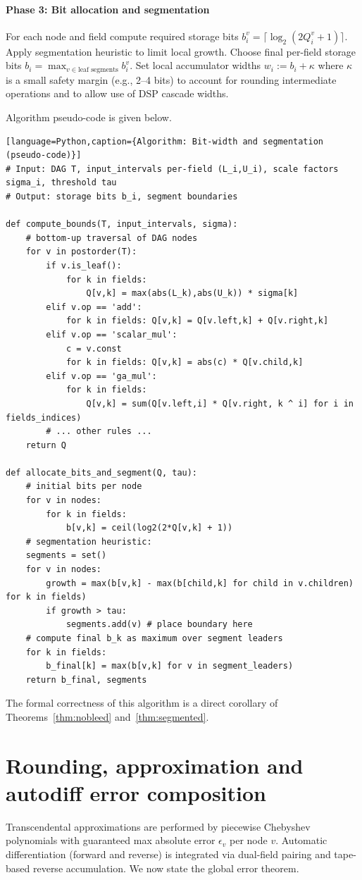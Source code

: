 \documentclass[11pt]{article}
\theoremstyle{definition}
\theoremstyle{plain}
\begin{document}
\paragraph{Phase 3: Bit allocation and segmentation} For each node and field compute required storage bits \(b_i^v = \lceil \log_2(2Q_i^v + 1)\rceil\). Apply segmentation heuristic to limit local growth. Choose final per-field storage bits \(b_i = \max_{v\in \text{leaf segments}} b_i^v\). Set local accumulator widths \(w_i := b_i + \kappa\) where \(\kappa\) is a small safety margin (e.g., 2--4 bits) to account for rounding intermediate operations and to allow use of DSP cascade widths.

Algorithm pseudo-code is given below.

\begin{verbatim}[language=Python,caption={Algorithm: Bit-width and segmentation (pseudo-code)}]
# Input: DAG T, input_intervals per-field (L_i,U_i), scale factors sigma_i, threshold tau
# Output: storage bits b_i, segment boundaries

def compute_bounds(T, input_intervals, sigma):
    # bottom-up traversal of DAG nodes
    for v in postorder(T):
        if v.is_leaf():
            for k in fields:
                Q[v,k] = max(abs(L_k),abs(U_k)) * sigma[k]
        elif v.op == 'add':
            for k in fields: Q[v,k] = Q[v.left,k] + Q[v.right,k]
        elif v.op == 'scalar_mul':
            c = v.const
            for k in fields: Q[v,k] = abs(c) * Q[v.child,k]
        elif v.op == 'ga_mul':
            for k in fields:
                Q[v,k] = sum(Q[v.left,i] * Q[v.right, k ^ i] for i in fields_indices)
        # ... other rules ...
    return Q

def allocate_bits_and_segment(Q, tau):
    # initial bits per node
    for v in nodes:
        for k in fields:
            b[v,k] = ceil(log2(2*Q[v,k] + 1))
    # segmentation heuristic:
    segments = set()
    for v in nodes:
        growth = max(b[v,k] - max(b[child,k] for child in v.children) for k in fields)
        if growth > tau:
            segments.add(v) # place boundary here
    # compute final b_k as maximum over segment leaders
    for k in fields:
        b_final[k] = max(b[v,k] for v in segment_leaders)
    return b_final, segments
\end{verbatim}

The formal correctness of this algorithm is a direct corollary of Theorems~\ref{thm:nobleed} and~\ref{thm:segmented}.

\section{Rounding, approximation and autodiff error composition}
Transcendental approximations are performed by piecewise Chebyshev polynomials with guaranteed max absolute error \(\epsilon_v\) per node \(v\). Automatic differentiation (forward and reverse) is integrated via dual-field pairing and tape-based reverse accumulation. We now state the global error theorem.
\end{document}
